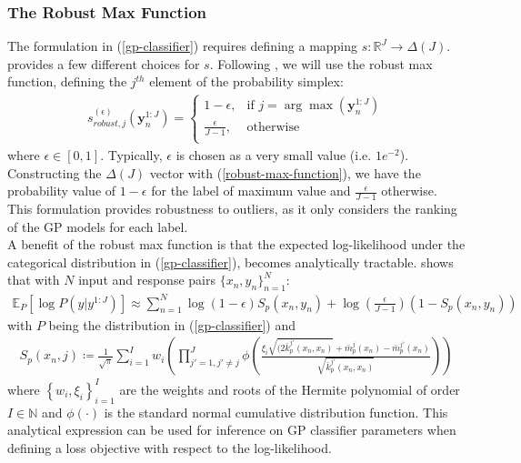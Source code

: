 \documentclass{article}
\numberwithin{equation}{section}
\begin{document}
\subsubsection{The Robust Max Function}
The formulation in (\ref{gp-classifier}) requires defining a mapping $s: \mathbb{R}^J \rightarrow \Delta(J)$. \cite{matthews2017scalable} provides a few different choices for $s$. Following \cite{wild2022generalized}, we will use the robust max function, defining the $j^{th}$ element of the probability simplex:
\begin{align}
s_{robust, j}^{(\epsilon)}\left(\mathbf{y}_n^{1:J}\right) = \begin{cases}
      1-\epsilon, &  \text{if } j = \arg \max\left(\mathbf{y}_n^{1:J}\right) \\
      \frac{\epsilon}{J-1}, & \text{otherwise} \\
   \end{cases}
   \label{robust-max-function}
\end{align}
where $\epsilon \in [0, 1]$. Typically, $\epsilon$ is chosen as a very small value (i.e. $1e^{-2}$). Constructing the $\Delta(J)$ vector with (\ref{robust-max-function}), we have the probability value of $1-\epsilon$ for the label of maximum value and $\frac{\epsilon}{J-1}$ otherwise. This formulation provides robustness to outliers, as it only considers the ranking of the GP models for each label.
\\A benefit of the robust max function is that the expected log-likelihood under the categorical distribution in (\ref{gp-classifier}), becomes analytically tractable. \cite{wild2022generalized} shows that with $N$ input and response pairs $\{x_n, y_n\}_{n=1}^N$:
\begin{align}
    \mathbb{E}_{P} \left[\log P\left(y \vert y^{1:J}\right)\right] \approx \sum_{n=1}^N \log(1-\epsilon) S_p(x_n, y_n) + \log\left(\frac{\epsilon}{J-1}\right) \left(1-S_p(x_n, y_n)\right)
    \label{robust-max-function-expected-log-likelihood}
\end{align}
with $P$ being the distribution in (\ref{gp-classifier}) and 
\begin{align}
    S_p(x_n, j) \coloneqq \frac{1}{\sqrt{\pi}}\sum_{i=1}^{I} w_i \left(\prod_{j'=1, j'\neq j}^J \phi\left(\frac{\xi_i\sqrt{(2 \bar{k}^{j'}_p(x_n, x_n)}+\bar{m}^{j}_p(x_n) - \bar{m}^{j'}_p(x_n)}{\sqrt{\bar{k}^{j'}_p(x_n, x_n)}}\right)\right)
\end{align}
where $\left\{w_i, \xi_i\right\}_{i=1}^I$ are the weights and roots of the Hermite polynomial of order $I \in \mathbb{N}$ and  $\phi(\cdot)$ is the standard normal cumulative distribution function. This analytical expression can be used for inference on GP classifier parameters when defining a loss objective with respect to the log-likelihood.
\end{document}
